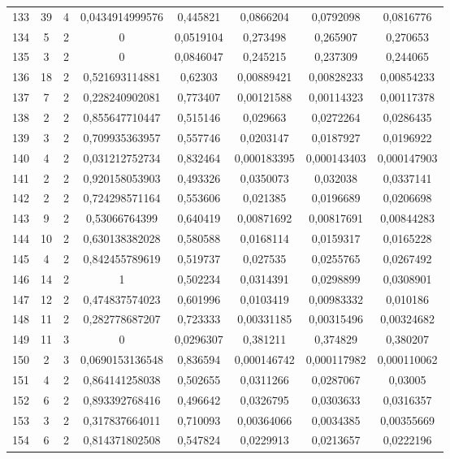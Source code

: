\begin{longtable}{|c|c|c|c|c|c|c|c|}
133 & 39 & 4 & 0,0434914999576 & 0,445821 & 0,0866204 & 0,0792098 & 0,0816776  \\
134 & 5 & 2 & 0 & 0,0519104 & 0,273498 & 0,265907 & 0,270653  \\
135 & 3 & 2 & 0 & 0,0846047 & 0,245215 & 0,237309 & 0,244065  \\
136 & 18 & 2 & 0,521693114881 & 0,62303 & 0,00889421 & 0,00828233 & 0,00854233  \\
137 & 7 & 2 & 0,228240902081 & 0,773407 & 0,00121588 & 0,00114323 & 0,00117378  \\
138 & 2 & 2 & 0,855647710447 & 0,515146 & 0,029663 & 0,0272264 & 0,0286435  \\
139 & 3 & 2 & 0,709935363957 & 0,557746 & 0,0203147 & 0,0187927 & 0,0196922  \\
140 & 4 & 2 & 0,031212752734 & 0,832464 & 0,000183395 & 0,000143403 & 0,000147903  \\
141 & 2 & 2 & 0,920158053903 & 0,493326 & 0,0350073 & 0,032038 & 0,0337141  \\
142 & 2 & 2 & 0,724298571164 & 0,553606 & 0,021385 & 0,0196689 & 0,0206698  \\
143 & 9 & 2 & 0,53066764399 & 0,640419 & 0,00871692 & 0,00817691 & 0,00844283  \\
144 & 10 & 2 & 0,630138382028 & 0,580588 & 0,0168114 & 0,0159317 & 0,0165228  \\
145 & 4 & 2 & 0,842455789619 & 0,519737 & 0,027535 & 0,0255765 & 0,0267492  \\
146 & 14 & 2 & 1 & 0,502234 & 0,0314391 & 0,0298899 & 0,0308901  \\
147 & 12 & 2 & 0,474837574023 & 0,601996 & 0,0103419 & 0,00983332 & 0,010186  \\
148 & 11 & 2 & 0,282778687207 & 0,723333 & 0,00331185 & 0,00315496 & 0,00324682  \\
149 & 11 & 3 & 0 & 0,0296307 & 0,381211 & 0,374829 & 0,380207  \\
150 & 2 & 3 & 0,0690153136548 & 0,836594 & 0,000146742 & 0,000117982 & 0,000110062  \\
151 & 4 & 2 & 0,864141258038 & 0,502655 & 0,0311266 & 0,0287067 & 0,03005  \\
152 & 6 & 2 & 0,893392768416 & 0,496642 & 0,0326795 & 0,0303633 & 0,0316357  \\
153 & 3 & 2 & 0,317837664011 & 0,710093 & 0,00364066 & 0,0034385 & 0,00355669  \\
154 & 6 & 2 & 0,814371802508 & 0,547824 & 0,0229913 & 0,0213657 & 0,0222196  \\

\end{longtable}
